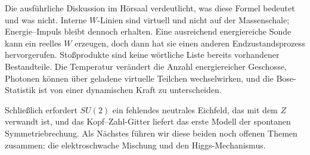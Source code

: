 Die ausführliche Diskussion im Hörsaal verdeutlicht, was diese Formel bedeutet und was nicht. Interne \(W\)-Linien sind virtuell und nicht auf der Massenschale; Energie--Impuls bleibt dennoch erhalten. Eine ausreichend energiereiche Sonde kann ein reelles \(W\) erzeugen, doch dann hat sie einen anderen Endzustandsprozess hervorgerufen. Stoßprodukte sind keine wörtliche Liste bereits vorhandener Bestandteile. Die Temperatur verändert die Anzahl energiereicher Geschosse, Photonen können über geladene virtuelle Teilchen wechselwirken, und die Bose-Statistik ist von einer dynamischen Kraft zu unterscheiden.

Schließlich erfordert \(SU(2)\) ein fehlendes neutrales Eichfeld, das mit dem \(Z\) verwandt ist, und das Kopf--Zahl-Gitter liefert das erste Modell der spontanen Symmetriebrechung. Als Nächstes führen wir diese beiden noch offenen Themen zusammen: die elektroschwache Mischung und den Higgs-Mechanismus.

